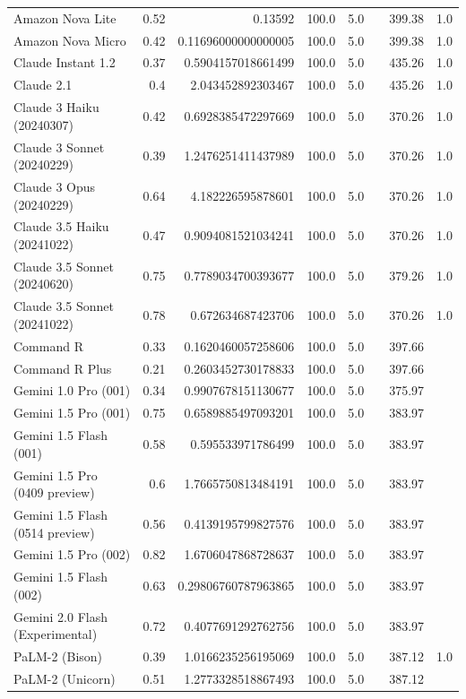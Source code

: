 \begin{table}[htp]
{\begin{tabular}{lrrrrrrr}
Amazon Nova Lite & 0.52 & 0.13592 & 100.0 & 5.0 &  & 399.38 & 1.0 \\
Amazon Nova Micro & 0.42 & 0.11696000000000005 & 100.0 & 5.0 &  & 399.38 & 1.0 \\
Claude Instant 1.2 & 0.37 & 0.5904157018661499 & 100.0 & 5.0 &  & 435.26 & 1.0 \\
Claude 2.1 & 0.4 & 2.043452892303467 & 100.0 & 5.0 &  & 435.26 & 1.0 \\
Claude 3 Haiku (20240307) & 0.42 & 0.6928385472297669 & 100.0 & 5.0 &  & 370.26 & 1.0 \\
Claude 3 Sonnet (20240229) & 0.39 & 1.2476251411437989 & 100.0 & 5.0 &  & 370.26 & 1.0 \\
Claude 3 Opus (20240229) & 0.64 & 4.182226595878601 & 100.0 & 5.0 &  & 370.26 & 1.0 \\
Claude 3.5 Haiku (20241022) & 0.47 & 0.9094081521034241 & 100.0 & 5.0 &  & 370.26 & 1.0 \\
Claude 3.5 Sonnet (20240620) & 0.75 & 0.7789034700393677 & 100.0 & 5.0 &  & 379.26 & 1.0 \\
Claude 3.5 Sonnet (20241022) & 0.78 & 0.672634687423706 & 100.0 & 5.0 &  & 370.26 & 1.0 \\
Command R & 0.33 & 0.1620460057258606 & 100.0 & 5.0 &  & 397.66 &  \\
Command R Plus & 0.21 & 0.2603452730178833 & 100.0 & 5.0 &  & 397.66 &  \\
Gemini 1.0 Pro (001) & 0.34 & 0.9907678151130677 & 100.0 & 5.0 &  & 375.97 &  \\
Gemini 1.5 Pro (001) & 0.75 & 0.6589885497093201 & 100.0 & 5.0 &  & 383.97 &  \\
Gemini 1.5 Flash (001) & 0.58 & 0.595533971786499 & 100.0 & 5.0 &  & 383.97 &  \\
Gemini 1.5 Pro (0409 preview) & 0.6 & 1.7665750813484191 & 100.0 & 5.0 &  & 383.97 &  \\
Gemini 1.5 Flash (0514 preview) & 0.56 & 0.4139195799827576 & 100.0 & 5.0 &  & 383.97 &  \\
Gemini 1.5 Pro (002) & 0.82 & 1.6706047868728637 & 100.0 & 5.0 &  & 383.97 &  \\
Gemini 1.5 Flash (002) & 0.63 & 0.29806760787963865 & 100.0 & 5.0 &  & 383.97 &  \\
Gemini 2.0 Flash (Experimental) & 0.72 & 0.4077691292762756 & 100.0 & 5.0 &  & 383.97 &  \\
PaLM-2 (Bison) & 0.39 & 1.0166235256195069 & 100.0 & 5.0 &  & 387.12 & 1.0 \\
PaLM-2 (Unicorn) & 0.51 & 1.2773328518867493 & 100.0 & 5.0 &  & 387.12 &  \\

\end{tabular}}
\end{table}

